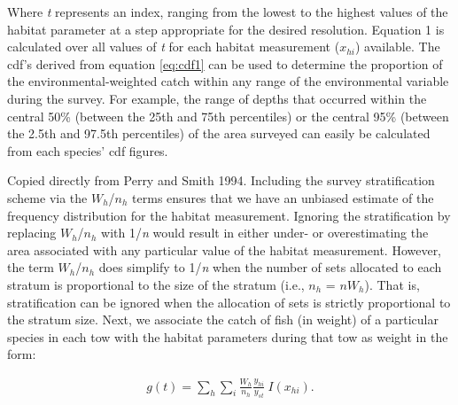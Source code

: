 \documentclass[11pt]{book}\usepackage[]{graphicx}\usepackage[]{color}
\begin{document}
Where \emph{t} represents an index, ranging from the lowest to the highest values of the habitat parameter at a step appropriate for the desired resolution. Equation 1 is calculated over all values of \emph{t} for each habitat measurement ($x_{hi}$) available. The cdf's derived from equation \ref{eq:cdf1} can be used to determine the proportion of the environmental-weighted catch within any range of the environmental variable during the survey. For example, the range of depths that occurred within the central 50\% (between the 25th and 75th percentiles) or the central 95\% (between the 2.5th and 97.5th percentiles) of the area surveyed can easily be calculated from each species' cdf figures.

Copied directly from Perry and Smith 1994. Including the survey stratification scheme via the $W_h$/$n_h$ terms ensures that we have an unbiased estimate of the frequency distribution for the habitat measurement. Ignoring the stratification by replacing $W_h$/$n_h$ with 1/\emph{n} would result in either under- or overestimating the area associated with any particular value of the habitat measurement. However, the term  $W_h$/$n_h$ does simplify to 1/\emph{n}  when the number of sets allocated to each stratum is proportional to the size of the stratum (i.e., $n_h$ = $nW_h$). That is, stratification can be ignored when the allocation of sets is strictly proportional to the stratum size.
Next, we associate the catch of fish (in weight) of a particular species in each tow with the habitat parameters during that tow as  weight in the form:

\begin{align} \label{eq:cdf2}
g(t) = \sum_{h}\sum_{i}\frac{W_h}{n_h}\frac{y_{hi}}{y_{st}}~I({x_{hi}}). %
\end{align}
\end{document}
